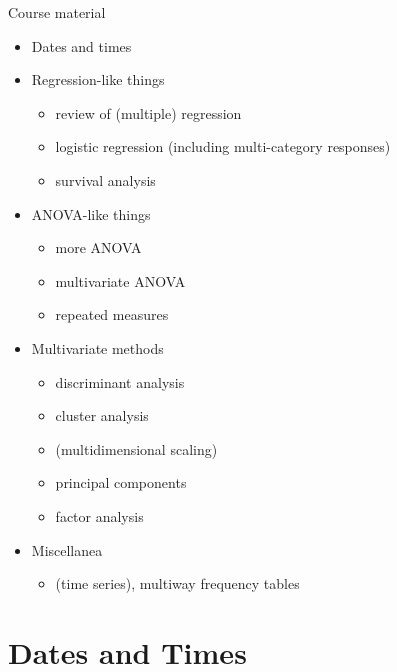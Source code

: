 \documentclass[
  ignorenonframetext,
]{beamer}
\providecommand{\tightlist}{%
  \setlength{\itemsep}{0pt}\setlength{\parskip}{0pt}}
\begin{document}
\begin{frame}{Course material}
\protect\hypertarget{course-material}{}

\begin{itemize}
\tightlist
\item
  Dates and times
\item
  Regression-like things

  \begin{itemize}
  \tightlist
  \item
    review of (multiple) regression
  \item
    logistic regression (including multi-category responses)
  \item
    survival analysis
  \end{itemize}
\item
  ANOVA-like things

  \begin{itemize}
  \tightlist
  \item
    more ANOVA
  \item
    multivariate ANOVA
  \item
    repeated measures
  \end{itemize}
\item
  Multivariate methods

  \begin{itemize}
  \tightlist
  \item
    discriminant analysis
  \item
    cluster analysis
  \item
    (multidimensional scaling)
  \item
    principal components
  \item
    factor analysis
  \end{itemize}
\item
  Miscellanea

  \begin{itemize}
  \tightlist
  \item
    (time series), multiway frequency tables
  \end{itemize}
\end{itemize}

\end{frame}

\hypertarget{dates-and-times}{%
\section{Dates and Times}\label{dates-and-times}}
\end{document}
